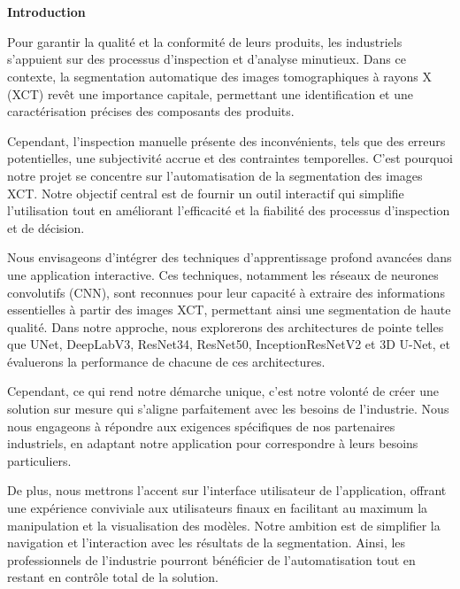 \documentclass{report}
\newenvironment{mystyle}{
	\setlength{\parindent}{0pt} %
	\setlength{\parskip}{10pt} %
	\fontsize{12pt}{14pt}\selectfont %
}{
}
\begin{document}
	\section*{}
	\vspace{0cm} %
	\begin{center}
		\huge\textbf{Introduction}
	\end{center}
	
	\vspace{1cm} %
	
	
	
	\begin{mystyle} 	Pour garantir la qualité et la conformité de leurs produits, les industriels s'appuient sur des processus d'inspection et d'analyse minutieux. Dans ce contexte, la segmentation automatique des images tomographiques à rayons X (XCT) revêt une importance capitale, permettant une identification et une caractérisation précises des composants des produits.
		
		Cependant, l'inspection manuelle présente des inconvénients, tels que des erreurs potentielles, une subjectivité accrue et des contraintes temporelles. C'est pourquoi notre projet se concentre sur l'automatisation de la segmentation des images XCT. Notre objectif central est de fournir un outil interactif qui simplifie l'utilisation tout en améliorant l'efficacité et la fiabilité des processus d'inspection et de décision.
		
		Nous envisageons d'intégrer des techniques d'apprentissage profond avancées dans une application interactive. Ces techniques, notamment les réseaux de neurones convolutifs (CNN), sont reconnues pour leur capacité à extraire des informations essentielles à partir des images XCT, permettant ainsi une segmentation de haute qualité. Dans notre approche, nous explorerons des architectures de pointe telles que UNet, DeepLabV3, ResNet34, ResNet50, InceptionResNetV2 et 3D U-Net, et évaluerons la performance de chacune de ces architectures.
		
		Cependant, ce qui rend notre démarche unique, c'est notre volonté de créer une solution sur mesure qui s'aligne parfaitement avec les besoins de l'industrie. Nous nous engageons à répondre aux exigences spécifiques de nos partenaires industriels, en adaptant notre application pour correspondre à leurs besoins particuliers.
		
		De plus, nous mettrons l'accent sur l'interface utilisateur de l'application, offrant une expérience conviviale aux utilisateurs finaux en facilitant au maximum la manipulation et la visualisation des modèles. Notre ambition est de simplifier la navigation et l'interaction avec les résultats de la segmentation. Ainsi, les professionnels de l'industrie pourront bénéficier de l'automatisation tout en restant en contrôle total de la solution.
		

\end{mystyle}
\end{document}
